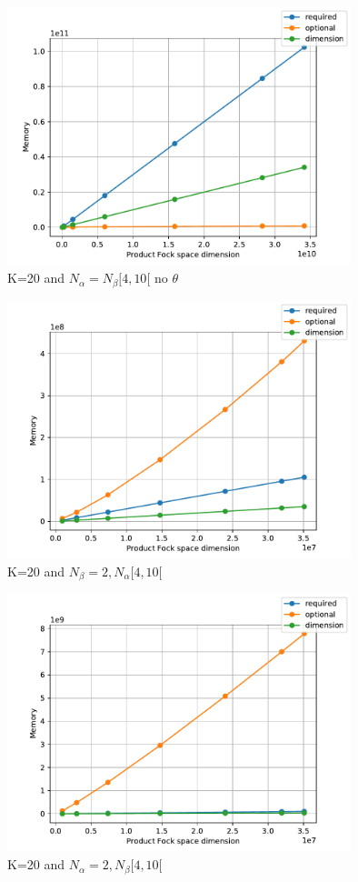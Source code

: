 \begin{center}
\begin{figure}
  \centering
  \includegraphics[width=10cm]{graphs/K=20_low.pdf}
  \caption{K=20 and $N_\alpha = N_\beta [4,10[$  no $\theta$}
  \label{}
\end{figure}

\begin{figure}
  \centering
  \includegraphics[width=10cm]{graphs/K=20_neq.pdf}
  \caption{K=20 and $N_\beta = 2, N_\alpha [4,10[$}
  \label{}
\end{figure}

\begin{figure}
  \centering
  \includegraphics[width=10cm]{graphs/K=20_neq_dumb.pdf}
  \caption{K=20 and $N_\alpha = 2, N_\beta [4,10[$}
  \label{}
\end{figure}


\end{center}
